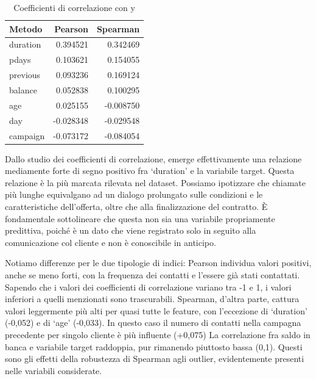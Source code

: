 \documentclass[11,5pt, a4paper]{article}
\begin{document}
\begin{table}[H]
    \centering
    \begin{tabular}{|l|r|r|}
    \hline
    Metodo    & Pearson & Spearman\\
    \hline
    duration  & 0.394521 & 0.342469\\
    \hline
    pdays     & 0.103621 & 0.154055\\
    \hline
    previous  & 0.093236 & 0.169124\\
    \hline
    balance   & 0.052838 & 0.100295\\
    \hline
    age       & 0.025155 & -0.008750\\
    \hline
    day       & -0.028348 & -0.029548\\
    \hline
    campaign  & -0.073172 & -0.084054\\
         \hline
    \end{tabular}
    \caption{Coefficienti di correlazione con y}
    \label{tab:correlation-table}
\end{table}

Dallo studio dei coefficienti di correlazione, emerge effettivamente una relazione mediamente forte di segno positivo fra ‘duration’ e la variabile target. Questa relazione è la più marcata rilevata nel dataset. Possiamo ipotizzare che chiamate più lunghe equivalgano ad un dialogo prolungato sulle condizioni e le caratteristiche dell’offerta, oltre che alla finalizzazione del contratto.
È fondamentale sottolineare che questa non sia una variabile propriamente predittiva, poiché è un dato che viene registrato solo in seguito alla comunicazione col cliente e non è conoscibile in anticipo. 

Notiamo differenze per le due tipologie di indici: Pearson individua valori positivi, anche se meno forti, con la frequenza dei contatti e l’essere già stati contattati.
Sapendo che i valori dei coefficienti di correlazione variano tra -1 e 1, i valori inferiori a quelli menzionati sono trascurabili.
Spearman, d’altra parte, cattura valori leggermente più alti per quasi tutte le feature, con l’eccezione di ‘duration’ (-0,052) e di ‘age’ (-0,033).
In questo caso il numero di contatti nella campagna precedente per singolo cliente è più influente (+0,075)
La correlazione fra saldo in banca e variabile target raddoppia, pur rimanendo piuttosto bassa (0,1).
Questi sono gli effetti della robustezza di Spearman agli outlier, evidentemente presenti nelle variabili considerate.
\end{document}
